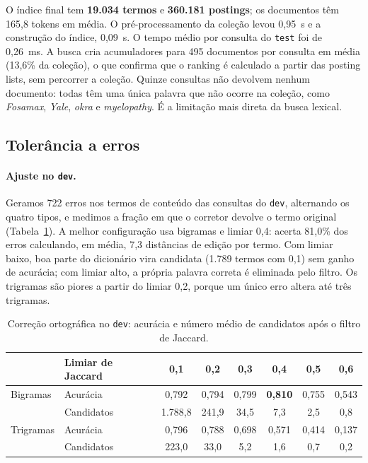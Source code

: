 \documentclass[11pt,a4paper]{article}
\newcommand{\cod}[1]{\texttt{#1}}
\begin{document}
O índice final tem \textbf{19.034 termos} e \textbf{360.181 postings}; os documentos têm 165,8 tokens em média. O pré-processamento da coleção levou 0,95~s e a construção do índice, 0,09~s. O tempo médio por consulta do \cod{test} foi de 0,26~ms. A busca cria acumuladores para 495 documentos por consulta em média (13,6\% da coleção), o que confirma que o ranking é calculado a partir das posting lists, sem percorrer a coleção. Quinze consultas não devolvem nenhum documento: todas têm uma única palavra que não ocorre na coleção, como \emph{Fosamax}, \emph{Yale}, \emph{okra} e \emph{myelopathy}. É a limitação mais direta da busca lexical.

\FloatBarrier
\subsection{Tolerância a erros}

\paragraph{Ajuste no \cod{dev}.} Geramos 722 erros nos termos de conteúdo das consultas do \cod{dev}, alternando os quatro tipos, e medimos a fração em que o corretor devolve o termo original (Tabela~\ref{tab:typodev}). A melhor configuração usa bigramas e limiar 0,4: acerta 81,0\% dos erros calculando, em média, 7,3 distâncias de edição por termo. Com limiar baixo, boa parte do dicionário vira candidata (1.789 termos com 0,1) sem ganho de acurácia; com limiar alto, a própria palavra correta é eliminada pelo filtro. Os trigramas são piores a partir do limiar 0,2, porque um único erro altera até três trigramas.

\begin{table}[!htb]
\centering\small
\caption{Correção ortográfica no \cod{dev}: acurácia e número médio de candidatos após o filtro de Jaccard.}
\label{tab:typodev}
\begin{tabular}{llcccccc}
\toprule
 & Limiar de Jaccard & 0,1 & 0,2 & 0,3 & 0,4 & 0,5 & 0,6 \\
\midrule
Bigramas & Acurácia & 0,792 & 0,794 & 0,799 & \textbf{0,810} & 0,755 & 0,543 \\
 & Candidatos & 1.788,8 & 241,9 & 34,5 & 7,3 & 2,5 & 0,8 \\
Trigramas & Acurácia & 0,796 & 0,788 & 0,698 & 0,571 & 0,414 & 0,137 \\
 & Candidatos & 223,0 & 33,0 & 5,2 & 1,6 & 0,7 & 0,2 \\
\bottomrule
\end{tabular}
\end{table}
\end{document}
